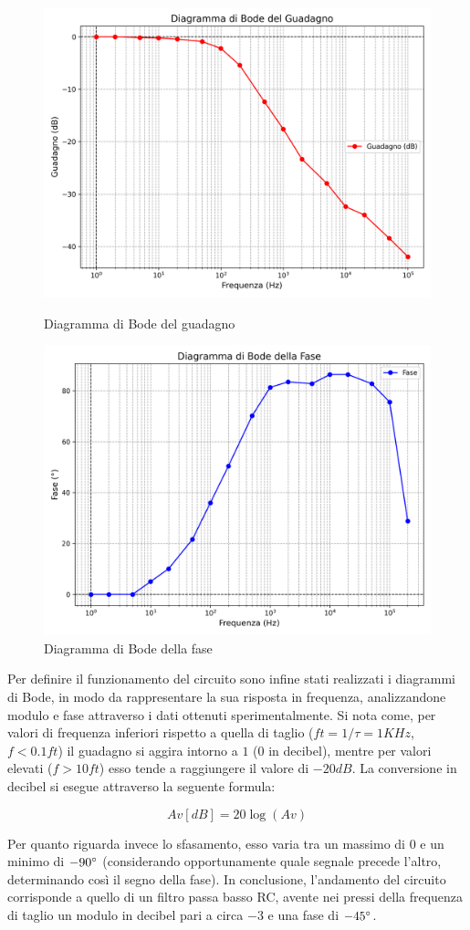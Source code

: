\begin{figure}[h]
    \begin{minipage}{0.5\textwidth}   
        \centering
        \includegraphics[width=0.8\linewidth]{guadagno_migliorato.png}
        \caption{Diagramma di Bode del guadagno}
        \label{fig:enter-label}
    \end{minipage}%
    \begin{minipage}{0.5\textwidth} 
        \centering
        \includegraphics[width=0.8\linewidth]{fase_migliorato.png}
        \caption{Diagramma di Bode della fase}
        \label{fig:enter-label}
    \end{minipage}
\end{figure}


Per definire il funzionamento del circuito sono infine stati realizzati i diagrammi di Bode, in modo da rappresentare la sua risposta in frequenza, analizzandone modulo e fase attraverso i dati ottenuti sperimentalmente. Si nota come, per valori di frequenza inferiori rispetto a quella di taglio ($ft = 1/\tau = 1 KHz$, $f < 0.1ft$) il guadagno si aggira intorno a $1$ ($0$ in decibel), mentre per valori elevati ($f > 10ft$) esso tende a raggiungere il valore di $-20 dB$.  La conversione in decibel si esegue attraverso la seguente formula:

$$Av [dB]=20\log(Av)$$

Per quanto riguarda invece lo sfasamento, esso varia tra un massimo di $0$ e un minimo di $-90\degree$ (considerando opportunamente quale segnale precede l’altro, determinando così il segno della fase). In conclusione, l’andamento del circuito corrisponde a quello di un filtro passa basso RC, avente nei pressi della frequenza di taglio un modulo in decibel pari a circa $-3$ e una fase di $-45\degree$.

